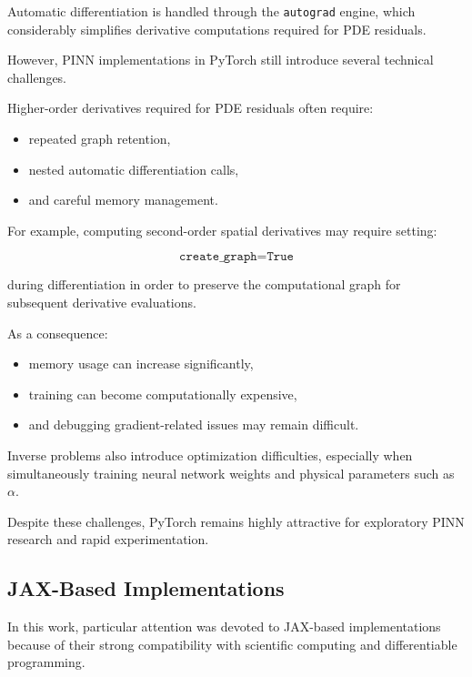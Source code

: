 Automatic differentiation is handled through the \texttt{autograd} engine, which considerably simplifies derivative computations required for PDE residuals.

However, PINN implementations in PyTorch still introduce several technical challenges.

Higher-order derivatives required for PDE residuals often require:
\begin{itemize}
    \item repeated graph retention,
    \item nested automatic differentiation calls,
    \item and careful memory management.
\end{itemize}

For example, computing second-order spatial derivatives may require setting:

\begin{equation}
\texttt{create\_graph=True}
\end{equation}

during differentiation in order to preserve the computational graph for subsequent derivative evaluations.

As a consequence:
\begin{itemize}
    \item memory usage can increase significantly,
    \item training can become computationally expensive,
    \item and debugging gradient-related issues may remain difficult.
\end{itemize}

Inverse problems also introduce optimization difficulties, especially when simultaneously training neural network weights and physical parameters such as $\alpha$.

Despite these challenges, PyTorch remains highly attractive for exploratory PINN research and rapid experimentation.

\subsection{JAX-Based Implementations}

In this work, particular attention was devoted to JAX-based implementations because of their strong compatibility with scientific computing and differentiable programming.

